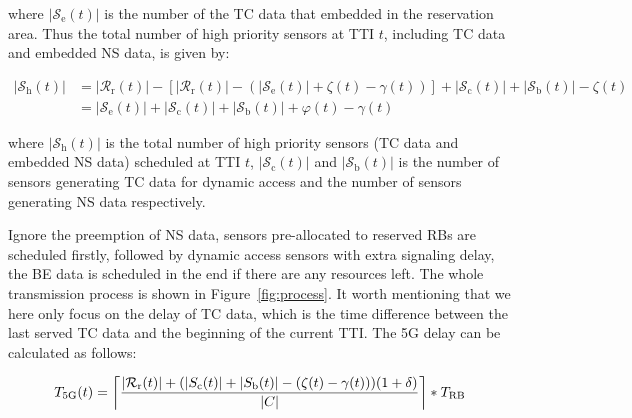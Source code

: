 \documentclass{SCIS2021}
\begin{document}
	\noindent where  $\left|\mathcal{S}_{\mathrm{e}}(t)\right|$ is the number of the TC data that embedded in the reservation area. Thus the total number of high priority sensors at TTI $t$, including TC data and embedded NS data, is given by:

	\setlength\abovedisplayskip{-13pt}
	\begin{center}
		\begin{equation}
			\begin{aligned}
				\left|\mathcal{S}_{\mathrm{h}}(t)\right| & =\left|\mathcal{R}_\mathrm{r}(t)\right|-\left[\left|\mathcal{R}_\mathrm{r}(t)\right|-\left(\left|\mathcal{S}_{\mathrm{e}}(t)\right|+\zeta(t)-\gamma(t)\right)\right]+\left|\mathcal{S}_{\mathrm{c}}(t)\right|+\left|\mathcal{S}_{\mathrm{b}}(t)\right|-\zeta(t) \\
				& = \left|\mathcal{S}_{\mathrm{e}}(t)\right| +\left|\mathcal{S}_{\mathrm{c}}(t)\right|+\left|\mathcal{S}_{\mathrm{b}}(t)\right| + \varphi(t) - \gamma(t)
			\end{aligned}
		\end{equation}
	\end{center}
	\setlength\belowdisplayskip{-8pt}

	\noindent where $\left|\mathcal{S}_{\mathrm{h}}(t)\right|$ is the total number of high priority sensors (TC data and embedded NS data) scheduled at TTI $t$, $\left|\mathcal{S}_{\mathrm{c}}(t)\right|$ and $\left|\mathcal{S}_{\mathrm{b}}(t)\right|$ is the number of sensors generating TC data for dynamic access and the number of sensors generating NS data respectively.

	\par Ignore the preemption of NS data, sensors pre-allocated to reserved RBs are scheduled firstly, followed by dynamic access sensors with extra signaling delay, the BE data is scheduled in the end if there are any resources left. The whole transmission process is shown in Figure~\ref{fig:process}. It worth mentioning that we here only focus on the delay of TC data, which is the time difference between the last served TC data and the beginning of the current TTI. The 5G delay can be calculated as follows:

	\setlength\abovedisplayskip{-13pt}
	\begin{center}
		\begin{equation}
			T_\text{5G}(t) = \bigg\lceil\frac{\arrowvert \mathcal{R}_{\mathrm{r}}(t) \arrowvert +(\arrowvert S_{\mathrm{c}}(t) \arrowvert + \arrowvert S_{\mathrm{b}}(t) \arrowvert -(\zeta(t) - \gamma(t)))(1+\delta) }{|C|} \bigg\rceil*T_\text{RB}
		\end{equation}
	\end{center}
	\setlength\belowdisplayskip{-8pt}
\end{document}
